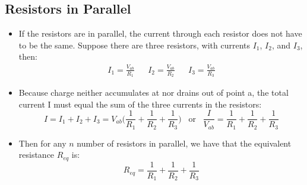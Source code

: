 \documentclass[11pt, a4paper]{article}
\begin{document}
\subsection{Resistors in Parallel}
\begin{itemize}
    \item If the resistors are in parallel, the current through each resistor does not
        have to be the same. Suppose there are three resistors, with currents $I_{1}$,
        $I_{2}$, and $I_{3}$, then:
        \begin{align}
            I_{1} = \frac{V_{ab}}{R_{1}} && I_{2} = \frac{V_{ab}}{R_{2}} &&
            I_{3} = \frac{V_{ab}}{R_{3}}
        \end{align}
    \item Because charge neither accumulates at nor drains out of point a, the total
        current I must equal the sum of the three currents in the resistors:
        \begin{equation}
            I = I_{1} + I_{2} + I_{3} =
            V_{ab}\bigg(\frac{1}{R_1} + \frac{1}{R_{2}} + \frac{1}{R_3}\bigg)
            \; \; \; \text{or} \; \; \;
            \frac{I}{V_{ab}} = \frac{1}{R_1} + \frac{1}{R_{2}} + \frac{1}{R_3}
        \end{equation}
    \item Then for any $n$ number of resistors in parallel, we have that the equivalent
        resistance $R_{eq}$ is:
        \begin{equation}
            R_{eq} = \frac{1}{R_1} + \frac{1}{R_2} + \frac{1}{R_{3}}
        \end{equation}
\end{itemize}
\end{document}
